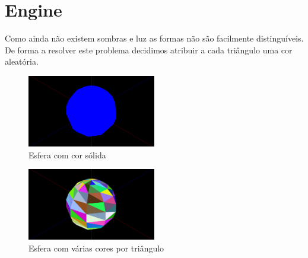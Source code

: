 \documentclass[a4paper]{report}
\begin{document}
\chapter{Engine}
Como ainda não existem sombras e luz as formas não são facilmente
distinguíveis. De forma a resolver este problema decidimos atribuir a cada
triângulo uma cor aleatória.
\begin{figure}[H]
    \centering 
    \includegraphics[width=0.5\textwidth]{images/sphere_onecolor.png}  
    \caption{Esfera com cor sólida}
    \label{fig:sphere_color}
\end{figure}
\begin{figure}[H]
    \centering 
    \includegraphics[width=0.5\textwidth]{images/sphere_color.png}  
    \caption{Esfera com várias cores por triângulo}
    \label{fig:sphere_onecolor}
\end{figure}
\end{document}
